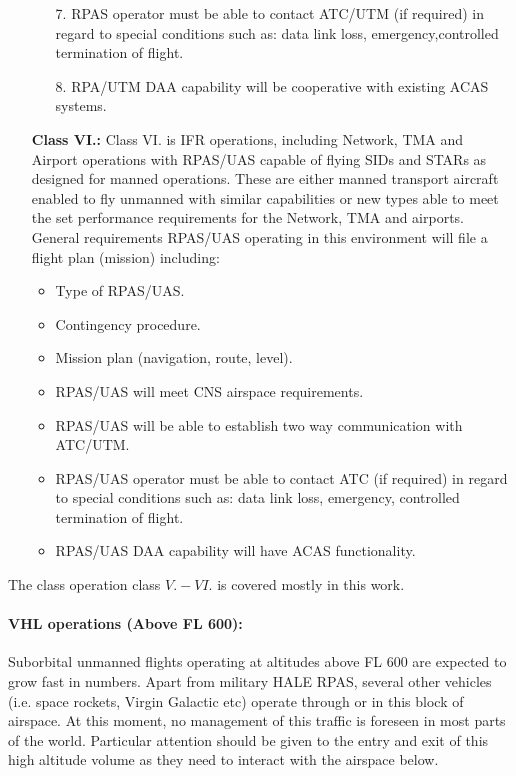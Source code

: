 \begin{itemize}
\begin{itemize}
        \item[7.]  RPAS operator must be able to contact ATC/UTM (if required) in regard to special conditions such as: data link loss, emergency,controlled termination of flight.
        
        \item[8.] RPA/UTM DAA capability will be cooperative with existing ACAS systems.
    \end{itemize}
    
    \item[\textbf{Class VI.:}] Class VI. is IFR operations, including Network, TMA and Airport operations with RPAS/UAS capable of flying SIDs and STARs as designed for manned operations. These are either manned transport aircraft enabled to fly unmanned with similar capabilities or new types able to meet the set performance requirements for the Network, TMA and airports. General requirements RPAS/UAS operating in this environment will file a flight plan (mission) including:
    \begin{itemize}
        \item Type of RPAS/UAS.
        \item Contingency procedure.
        \item Mission plan (navigation, route, level).
        \item RPAS/UAS will meet CNS airspace requirements.
        \item RPAS/UAS will be able to establish two way communication with ATC/UTM.
        \item RPAS/UAS operator must be able to contact ATC (if required) in regard to special conditions such as: data link loss, emergency, controlled termination of flight.
        \item RPAS/UAS DAA capability will have ACAS functionality.
    \end{itemize}
\end{itemize}

\begin{note}
    The class operation class $V.-VI.$ is covered mostly in this work.
\end{note}

\paragraph{VHL operations (Above FL 600):} Suborbital unmanned flights operating at altitudes above FL 600 are expected to grow fast in numbers. Apart from military HALE RPAS, several other vehicles (i.e. space rockets, Virgin Galactic etc) operate through or in this block of airspace. At this moment, no management of this traffic is foreseen in most parts of the world. Particular attention should be given to the entry and exit of this high altitude volume as they need to interact with the airspace below.

